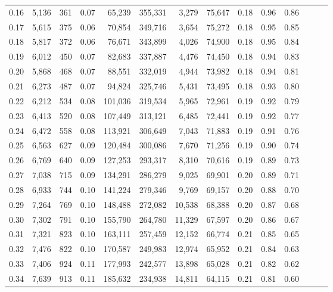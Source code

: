 \begin{tabular}{rrrrrrrrrrrrrr}
0.16 &  5,136 &    361 &  0.07 &   65,239 &  355,331 &   3,279 &  75,647 &  0.18 &  0.96 &      0.86 \\
0.17 &  5,615 &    375 &  0.06 &   70,854 &  349,716 &   3,654 &  75,272 &  0.18 &  0.95 &      0.85 \\
0.18 &  5,817 &    372 &  0.06 &   76,671 &  343,899 &   4,026 &  74,900 &  0.18 &  0.95 &      0.84 \\
0.19 &  6,012 &    450 &  0.07 &   82,683 &  337,887 &   4,476 &  74,450 &  0.18 &  0.94 &      0.83 \\
0.20 &  5,868 &    468 &  0.07 &   88,551 &  332,019 &   4,944 &  73,982 &  0.18 &  0.94 &      0.81 \\
0.21 &  6,273 &    487 &  0.07 &   94,824 &  325,746 &   5,431 &  73,495 &  0.18 &  0.93 &      0.80 \\
0.22 &  6,212 &    534 &  0.08 &  101,036 &  319,534 &   5,965 &  72,961 &  0.19 &  0.92 &      0.79 \\
0.23 &  6,413 &    520 &  0.08 &  107,449 &  313,121 &   6,485 &  72,441 &  0.19 &  0.92 &      0.77 \\
0.24 &  6,472 &    558 &  0.08 &  113,921 &  306,649 &   7,043 &  71,883 &  0.19 &  0.91 &      0.76 \\
0.25 &  6,563 &    627 &  0.09 &  120,484 &  300,086 &   7,670 &  71,256 &  0.19 &  0.90 &      0.74 \\
0.26 &  6,769 &    640 &  0.09 &  127,253 &  293,317 &   8,310 &  70,616 &  0.19 &  0.89 &      0.73 \\
0.27 &  7,038 &    715 &  0.09 &  134,291 &  286,279 &   9,025 &  69,901 &  0.20 &  0.89 &      0.71 \\
0.28 &  6,933 &    744 &  0.10 &  141,224 &  279,346 &   9,769 &  69,157 &  0.20 &  0.88 &      0.70 \\
0.29 &  7,264 &    769 &  0.10 &  148,488 &  272,082 &  10,538 &  68,388 &  0.20 &  0.87 &      0.68 \\
0.30 &  7,302 &    791 &  0.10 &  155,790 &  264,780 &  11,329 &  67,597 &  0.20 &  0.86 &      0.67 \\
0.31 &  7,321 &    823 &  0.10 &  163,111 &  257,459 &  12,152 &  66,774 &  0.21 &  0.85 &      0.65 \\
0.32 &  7,476 &    822 &  0.10 &  170,587 &  249,983 &  12,974 &  65,952 &  0.21 &  0.84 &      0.63 \\
0.33 &  7,406 &    924 &  0.11 &  177,993 &  242,577 &  13,898 &  65,028 &  0.21 &  0.82 &      0.62 \\
0.34 &  7,639 &    913 &  0.11 &  185,632 &  234,938 &  14,811 &  64,115 &  0.21 &  0.81 &      0.60 \\

\end{tabular}
